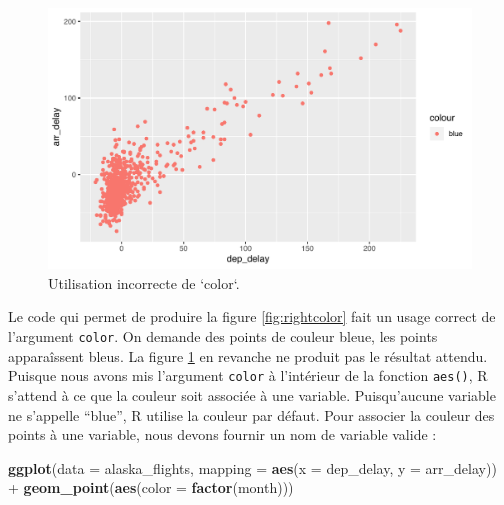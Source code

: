 \documentclass[
  a4paper,
]{article}
\newenvironment{Shaded}{\begin{snugshade}}{\end{snugshade}}
\newcommand{\DataTypeTok}[1]{\textcolor[rgb]{0.00,0.34,0.68}{#1}}
\newcommand{\KeywordTok}[1]{\textcolor[rgb]{0.12,0.11,0.11}{\textbf{#1}}}
\newcommand{\NormalTok}[1]{\textcolor[rgb]{0.12,0.11,0.11}{#1}}
\newcommand{\OperatorTok}[1]{\textcolor[rgb]{0.12,0.11,0.11}{#1}}
\newcommand{\StringTok}[1]{\textcolor[rgb]{0.75,0.01,0.01}{#1}}
\begin{document}
\begin{figure}[htpb]

{\centering \includegraphics[width=0.9\linewidth]{figure/wrongcolor-1} 

}

\caption{Utilisation incorrecte de `color`.}\label{fig:wrongcolor}
\end{figure}

Le code qui permet de produire la figure \ref{fig:rightcolor} fait un usage correct de l'argument \texttt{color}. On demande des points de couleur bleue, les points apparaîssent bleus. La figure \ref{fig:wrongcolor} en revanche ne produit pas le résultat attendu. Puisque nous avons mis l'argument \texttt{color} à l'intérieur de la fonction \texttt{aes()}, R s'attend à ce que la couleur soit associée à une variable. Puisqu'aucune variable ne s'appelle ``blue'', R utilise la couleur par défaut. Pour associer la couleur des points à une variable, nous devons fournir un nom de variable valide :

\begin{Shaded}
\begin{Highlighting}[]
\KeywordTok{ggplot}\NormalTok{(}\DataTypeTok{data =}\NormalTok{ alaska_flights, }\DataTypeTok{mapping =} \KeywordTok{aes}\NormalTok{(}\DataTypeTok{x =}\NormalTok{ dep_delay, }\DataTypeTok{y =}\NormalTok{ arr_delay)) }\OperatorTok{+}
\StringTok{  }\KeywordTok{geom_point}\NormalTok{(}\KeywordTok{aes}\NormalTok{(}\DataTypeTok{color =} \KeywordTok{factor}\NormalTok{(month)))}
\end{Highlighting}
\end{Shaded}
\end{document}
